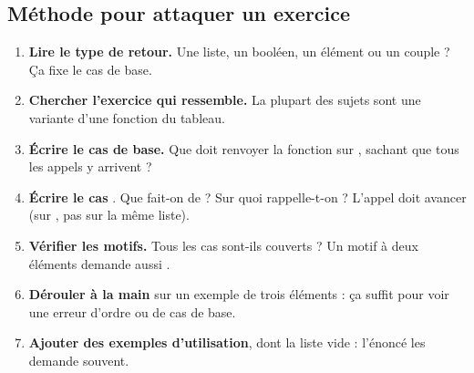 \documentclass[11pt,a4paper]{article}
\newcommand{\code}[1]{\texttt{\detokenize{#1}}}
\begin{document}
\subsection{Méthode pour attaquer un exercice}

\begin{enumerate}[leftmargin=*, label=\textcolor{camel}{\sffamily\bfseries\arabic*.}]
  \item \textbf{Lire le type de retour.} Une liste, un booléen, un élément ou un couple ? Ça fixe le cas de base.
  \item \textbf{Chercher l'exercice qui ressemble.} La plupart des sujets sont une variante d'une fonction du tableau.
  \item \textbf{Écrire le cas de base.} Que doit renvoyer la fonction sur \code{[]}, sachant que tous les appels y arrivent ?
  \item \textbf{Écrire le cas} \code{e :: l}. Que fait-on de \code{e} ? Sur quoi rappelle-t-on ? L'appel doit avancer (sur \code{l}, pas sur la même liste).
  \item \textbf{Vérifier les motifs.} Tous les cas sont-ils couverts ? Un motif à deux éléments demande aussi \code{[_]}.
  \item \textbf{Dérouler à la main} sur un exemple de trois éléments : ça suffit pour voir une erreur d'ordre ou de cas de base.
  \item \textbf{Ajouter des exemples d'utilisation}, dont la liste vide : l'énoncé les demande souvent.
\end{enumerate}
\end{document}
